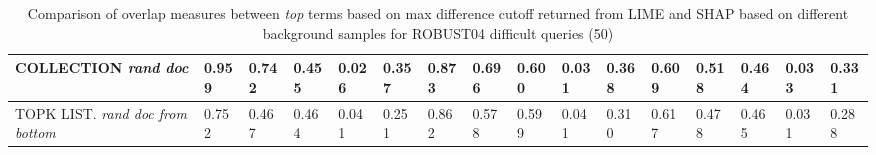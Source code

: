 \begin{table}
{\begin{tabular}{ |m{6em}|m{2em}|m{2em}|m{2em}|m{2em}|m{2.8em}||m{2em}|m{2em}|m{2em}|m{2em}|m{2.8em}||m{2em}|m{2em}|m{2em}|m{2em}|m{2.8em}|| }


COLLECTION \newline \textit{rand doc} & 0.959 & 0.742 & 0.455 & 0.026 & 0.357 & 0.873 & 0.696 & 0.600 & 0.031 & 0.368 & 0.609 & 0.518 & 0.464 & 0.033 & 0.331\\
\hline

TOPK LIST. \newline \textit{rand doc from bottom} & 0.752 & 0.467 & 0.464 & 0.041 & 0.251 & 0.862 & 0.578 & 0.599 & 0.041 & 0.310 & 0.617 & 0.478 & 0.465 & 0.031 & 0.288\\
\hline
 
 \end{tabular}}
\caption{Comparison of overlap measures between \textit{top} terms based on max difference cutoff returned from LIME and SHAP based on different background samples for ROBUST04 difficult queries (50)}
\label{table_diff_max_terms}
\end{table}

